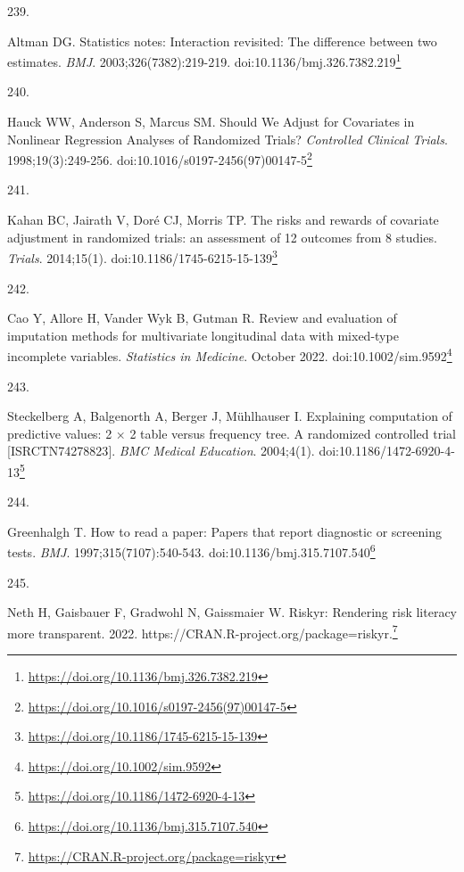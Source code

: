 \documentclass[
  a4paper,
]{book}
\newlength{\cslhangindent}
\newlength{\csllabelwidth}
\newlength{\cslentryspacingunit} %
\newenvironment{CSLReferences}[2] %
 {%
  \setlength{\parindent}{0pt}
  \ifodd #1
  \let\oldpar\par
  \def\par{\hangindent=\cslhangindent\oldpar}
  \fi
  \setlength{\parskip}{#2\cslentryspacingunit}
 }%
 {}
\newcommand{\CSLLeftMargin}[1]{\parbox[t]{\csllabelwidth}{#1}}
\newcommand{\CSLRightInline}[1]{\parbox[t]{\linewidth - \csllabelwidth}{#1}\break}
\renewcommand{\href}[2]{#2\footnote{\url{#1}}}
\begin{document}
\begin{CSLReferences}{0}{0}
\leavevmode{}%
\CSLLeftMargin{239. }%
\CSLRightInline{Altman DG. Statistics notes: Interaction revisited: The difference between two estimates. \emph{BMJ}. 2003;326(7382):219-219. doi:\href{https://doi.org/10.1136/bmj.326.7382.219}{10.1136/bmj.326.7382.219}}

\leavevmode{}%
\CSLLeftMargin{240. }%
\CSLRightInline{Hauck WW, Anderson S, Marcus SM. Should We Adjust for Covariates in Nonlinear Regression Analyses of Randomized Trials? \emph{Controlled Clinical Trials}. 1998;19(3):249-256. doi:\href{https://doi.org/10.1016/s0197-2456(97)00147-5}{10.1016/s0197-2456(97)00147-5}}

\leavevmode{}%
\CSLLeftMargin{241. }%
\CSLRightInline{Kahan BC, Jairath V, Doré CJ, Morris TP. The risks and rewards of covariate adjustment in randomized trials: an assessment of 12 outcomes from 8 studies. \emph{Trials}. 2014;15(1). doi:\href{https://doi.org/10.1186/1745-6215-15-139}{10.1186/1745-6215-15-139}}

\leavevmode{}%
\CSLLeftMargin{242. }%
\CSLRightInline{Cao Y, Allore H, Vander Wyk B, Gutman R. Review and evaluation of imputation methods for multivariate longitudinal data with mixed{-}type incomplete variables. \emph{Statistics in Medicine}. October 2022. doi:\href{https://doi.org/10.1002/sim.9592}{10.1002/sim.9592}}

\leavevmode{}%
\CSLLeftMargin{243. }%
\CSLRightInline{Steckelberg A, Balgenorth A, Berger J, Mühlhauser I. Explaining computation of predictive values: 2 × 2 table versus frequency tree. A randomized controlled trial {[}ISRCTN74278823{]}. \emph{BMC Medical Education}. 2004;4(1). doi:\href{https://doi.org/10.1186/1472-6920-4-13}{10.1186/1472-6920-4-13}}

\leavevmode{}%
\CSLLeftMargin{244. }%
\CSLRightInline{Greenhalgh T. How to read a paper: Papers that report diagnostic or screening tests. \emph{BMJ}. 1997;315(7107):540-543. doi:\href{https://doi.org/10.1136/bmj.315.7107.540}{10.1136/bmj.315.7107.540}}

\leavevmode{}%
\CSLLeftMargin{245. }%
\CSLRightInline{Neth H, Gaisbauer F, Gradwohl N, Gaissmaier W. Riskyr: Rendering risk literacy more transparent. 2022. \href{https://CRAN.R-project.org/package=riskyr}{https://CRAN.R-project.org/package=riskyr.}}


\end{CSLReferences}
\end{document}
